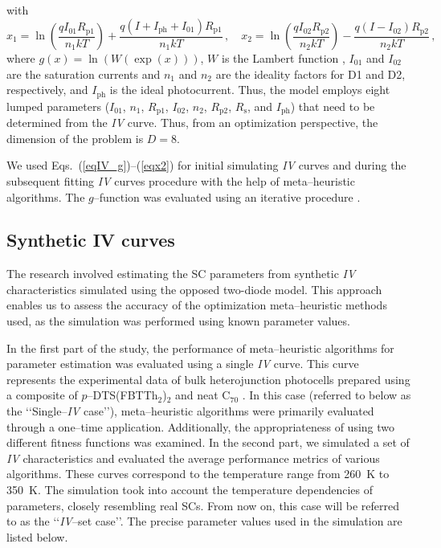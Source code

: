 \documentclass[a4paper,fleqn]{cas-sc}
\begin{document}
with
\begin{equation}
\label{eqx2}
x_1= \ln\left(\frac{qI_{01}R_\mathrm{p1}}{n_1kT}\right)+\frac{q(I+I_\mathrm{ph}+I_{01})R_\mathrm{p1}}{n_1kT}\,,\quad
x_2= \ln\left(\frac{qI_{02}R_\mathrm{p2}}{n_2kT}\right)-\frac{q(I-I_{02})R_\mathrm{p2}}{n_2kT}\,,
\end{equation}
where
$g(x)=\ln(W(\exp(x)))$,
$W$ is the Lambert function \cite{LambertNew},
$I_{01}$ and $I_{02}$ are the saturation currents and
$n_1$ and $n_2$ are
the ideality factors for D1 and D2, respectively,
and $I_\mathrm{ph}$ is the ideal photocurrent.
Thus, the model employs eight lumped parameters
($I_{01}$, $n_1$, $R_\mathrm{p1}$, $I_{02}$, $n_2$, $R_\mathrm{p2}$,
$R_\mathrm{s}$, and $I_\mathrm{ph}$)
that need to be determined from the \emph{IV} curve.
Thus, from an optimization perspective, the dimension of the problem is $D=8$.

We used Eqs.~(\ref{eqIV_g})--(\ref{eqx2}) for initial simulating \emph{IV} curves
and during the subsequent fitting \emph{IV} curves procedure with the help of meta--heuristic algorithms.
The $g$--function was evaluated using an iterative procedure \cite{roberts2015calculating}.



\subsection{Synthetic IV curves}\label{SynIV}

The research involved estimating the SC parameters from synthetic \emph{IV} characteristics simulated using the opposed two-diode model.
This approach enables us to assess the accuracy of the optimization meta--heuristic methods used,
as the simulation was performed using known parameter values.


In the first part of the study, the performance of meta--heuristic algorithms for parameter estimation was evaluated using a single \emph{IV} curve.
This curve represents the experimental data of bulk heterojunction photocells prepared
using a composite of $p$--DTS(FBTTh$_2$)$_2$ and neat C$_{70}$ \cite{Tada2015Organic}.
In this case (referred to below as the ‘‘Single--\emph{IV} case’’), meta--heuristic algorithms were primarily evaluated through a one--time application.
Additionally, the appropriateness of using two different fitness functions was examined.
In the second part, we simulated a set of \emph{IV} characteristics and evaluated the average performance metrics of various algorithms.
These curves correspond to the temperature range from 260~K to 350~K.
The simulation took into account the temperature dependencies of parameters, closely resembling real SCs.
From now on, this case will be referred to as the ‘‘\emph{IV}--set case’’.
The precise parameter values used in the simulation are listed below.
\end{document}

